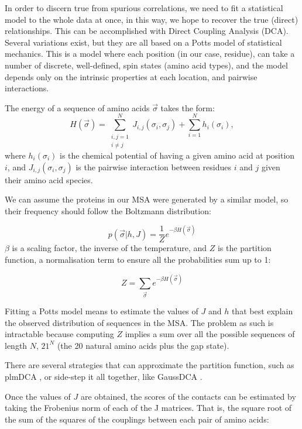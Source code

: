 In order to discern true from spurious correlations, we need to fit a statistical model to the whole data at once, in this way, we hope to recover the true (direct) relationships.
This can be accomplished with Direct Coupling Analysis (DCA).
Several variations exist, but they are all based on a Potts model of statistical mechanics.
This is a model where each position (in our case, residue), can take a number of discrete, well-defined, spin states (amino acid types), and the model depends only on the intrinsic properties at each location, and pairwise interactions.

The energy of a sequence of amino acids $\vec{\sigma}$ takes the form:
\begin{equation*}
H(\vec \sigma) = \sum_{\substack{i,j=1\\i \neq j}}^N J_{i, j}(\sigma_i, \sigma_j) + \sum_{i=1}^N h_i(\sigma_i),
\end{equation*}
where $h_i(\sigma_i)$ is the chemical potential of having a given amino acid at position $i$, and $ J_{i, j}(\sigma_i, \sigma_j)$ is the pairwise interaction between residues $i$ and $j$ given their amino acid species.

We can assume the proteins in our MSA were generated by a similar model, so their frequency should follow the Boltzmann distribution:

\begin{equation*}
p(\vec{\sigma} |  h, J) = \frac{1}{Z} e^{-\beta H\left(\vec{\sigma}\right)}
\end{equation*}
$\beta$ is a scaling factor, the inverse of the temperature, and $Z$ is the partition function, a normalisation term to ensure all the probabilities sum up to 1:

\begin{equation*}
Z = \sum_{\vec{\sigma}} e^{-\beta H\left(\vec{\sigma}\right)}
\end{equation*}

Fitting a Potts model means to estimate the values of $J$ and $h$ that best explain the observed distribution of sequences in the MSA.
The problem as such is intractable because computing $Z$ implies a sum over all the possible sequences of length $N$, $21^N$ (the 20 natural amino acids plus the gap state).

There are several strategies that can approximate the partition function, such as plmDCA \citep{plmDCA}, or side-step it all together, like GaussDCA \citep{GaussDCA}.

Once the values of $J$ are obtained, the scores of the contacts can be estimated by taking the Frobenius norm of each of the J matrices.
That is, the square root of the sum of the squares of the couplings between each pair of amino acids:

